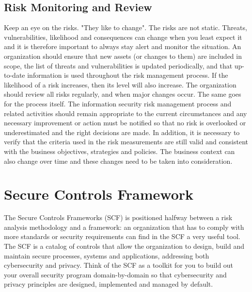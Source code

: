 \subsection{Risk Monitoring and Review}
Keep an eye on the risks. "They like to change". The risks are not static. Threats, vulnerabilities, likelihood and consequences can change when you least expect it and it is therefore important to always stay alert and monitor the situation. An organization should ensure that new assets (or changes to them) are included in scope, the list of threats and vulnerabilities is updated periodically, and that up-to-date information is used throughout the risk management process. If the likelihood of a risk increases, then its level will also increase. The organization should review all risks regularly, and when major changes occur. The same goes for the process itself. The information security risk management process and related activities should remain appropriate to the current circumstances and any necessary improvement or action must be notified so that no risk is overlooked or underestimated and the right decisions are made. In addition, it is necessary to verify that the criteria used in the risk measurements are still valid and consistent with the business objectives, strategies and policies. The business context can also change over time and these changes need to be taken into consideration.
\section{Secure Controls Framework}
The Secure Controls Frameworks (SCF) \cite{SCF2021} is positioned halfway between a risk analysis methodology and a framework: an organization that has to comply with more standards or security requirements can find in the SCF a very useful tool. The SCF is a catalog of controls that allow the organization to design, build and maintain secure processes, systems and applications, addressing both cybersecurity and privacy. Think of the SCF as a toolkit for you to build out your overall security program domain-by-domain so that cybersecurity and privacy principles are designed, implemented and managed by default.
